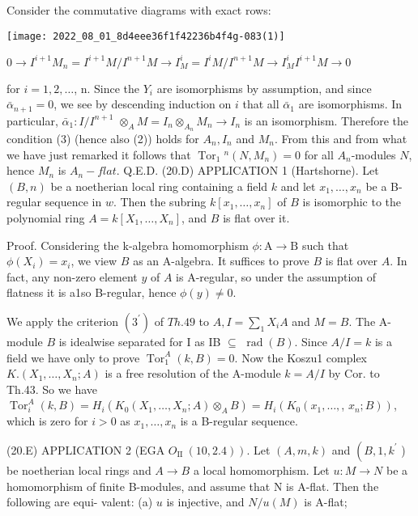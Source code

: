 Consider the commutative diagrams with exact rows:

\texttt{[image: 2022\_08\_01\_8d4eee36f1f42236b4f4g-083(1)]}

$0 \rightarrow I^{i+1} M_{n}=I^{i+1} M / I^{n+1} M \rightarrow I_{M}^{i}=I^{i} M / I^{n+1} M \rightarrow I_{M}^{i} I^{i+1} M \rightarrow 0$

for $i=1,2, \ldots$, n. Since the $Y_{i}$ are isomorphisms by assumption, and since $\bar{\alpha}_{n+1}=0$, we see by descending induction on $i$ that all $\bar{\alpha}_{1}$ are isomorphisms. In particular, $\bar{\alpha}_{1}: I / I^{n+1}$ $\otimes_{A} M=I_{n} \otimes_{A_{n}} M_{n} \rightarrow I_{n}$ is an isomorphism. Therefore the condition (3) (hence also (2)) holds for $A_{n}, I_{n}$ and $M_{n}$. From this and from what we have just remarked it follows that $\operatorname{Tor}_{1}{ }^{n}\left(N, M_{n}\right)=0$ for all $A_{n}$-modules $N$, hence $M_{n}$ is $A_{n}-f l a t$. Q.E.D. (20.D) APPLICATION 1 (Hartshorne). Let $(B, n)$ be a noetherian local ring containing a field $k$ and let $x_{1}, \ldots, x_{n}$ be a B-regular sequence in $w$. Then the subring $k\left[x_{1}, \ldots, x_{n}\right]$ of $B$ is isomorphic to the polynomial ring $A=k\left[X_{1}, \ldots, X_{n}\right]$, and $B$ is flat over it.

Proof. Considering the k-algebra homomorphism $\phi: \mathrm{A} \rightarrow \mathrm{B}$ such that $\phi\left(X_{i}\right)=x_{i}$, we view $B$ as an A-algebra. It suffices to prove $B$ is flat over $A$. In fact, any non-zero element $y$ of $A$ is A-regular, so under the assumption of flatness it is a1so B-regular, hence $\phi(y) \neq 0$.

We apply the criterion $\left(3^{\prime}\right)$ of $T h .49$ to $A, I=\sum_{1} X_{i} A$ and $M=B$. The A-module $B$ is idealwise separated for I as IB $\subseteq$ $\operatorname{rad}(B)$. Since $A / I=k$ is a field we have only to prove $\operatorname{Tor}_{1}^{A}(k, B)=0$. Now the Koszu1 complex $K .\left(X_{1}, \ldots, X_{n} ; A\right)$ is a free resolution of the A-module $k=A / I$ by Cor. to Th.43. So we have $\operatorname{Tor}_{i}^{A}(k, B)=H_{i}\left(K_{0}\left(X_{1}, \ldots, X_{n} ; A\right) \otimes_{A} B\right)=H_{i}\left(K_{0}\left(x_{1}, \ldots,\right.\right.$, $\left.\left.x_{n} ; B\right)\right)$, which is zero for $i>0$ as $x_{1}, \ldots, x_{n}$ is a B-regular sequence.

(20.E) APPLICATION 2 (EGA $\left.O_{\text {II }}(10,2.4)\right)$. Let $(A, m, k)$ and $\left(B, 1, k^{\prime}\right.$ ) be noetherian local rings and $A \rightarrow B$ a local homomorphism. Let $u: M \rightarrow N$ be a homomorphism of finite B-modules, and assume that $\mathrm{N}$ is A-flat. Then the following are equi- valent: (a) $u$ is injective, and $N / u(M)$ is A-flat;

